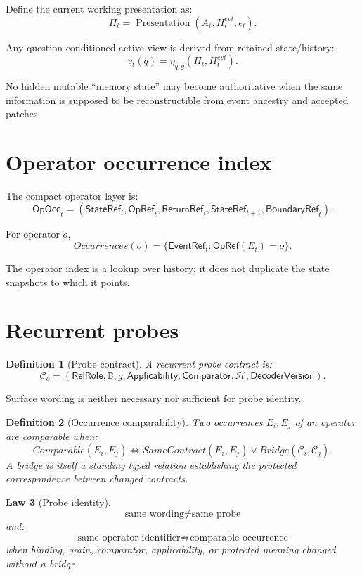 \documentclass[11pt,oneside]{article}
\newtheorem{definition}{Definition}[section]
\newtheorem{law}[definition]{Law}
\newcommand{\B}{\mathbb B}
\newcommand{\StateRef}{\mathsf{StateRef}}
\newcommand{\ReturnRef}{\mathsf{ReturnRef}}
\newcommand{\OpRef}{\mathsf{OpRef}}
\newcommand{\BoundaryRef}{\mathsf{BoundaryRef}}
\newcommand{\EventRef}{\mathsf{EventRef}}
\begin{document}
Define the current working presentation as:
\[
\boxed{
\Pi_t=\operatorname{Presentation}(A_t,H_t^{evt},\epsilon_t).
}
\]

Any question-conditioned active view is derived from retained state/history:
\[
v_t(q)=\eta_{q,g}(\Pi_t,H_t^{evt}).
\]

No hidden mutable ``memory state'' may become authoritative when the same information is supposed to be reconstructible from event ancestry and accepted patches.

\section{Operator occurrence index}

The compact operator layer is:
\[
\boxed{
\mathsf{OpOcc}_t
=
(
\StateRef_t,
\OpRef_t,
\ReturnRef_t,
\StateRef_{t+1},
\BoundaryRef_t
).
}
\]

For operator \(o\),
\[
\boxed{
Occurrences(o)
=
\{
\EventRef_t:
\OpRef(E_t)=o
\}.
}
\]

The operator index is a lookup over history; it does not duplicate the state snapshots to which it points.

\section{Recurrent probes}

\begin{definition}[Probe contract]
A recurrent probe contract is:
\[
\boxed{
\mathcal C_o=
(
\mathsf{RelRole},
\B,
g,
\mathsf{Applicability},
\mathsf{Comparator},
\mathcal H,
\mathsf{DecoderVersion}
).
}
\]
\end{definition}

Surface wording is neither necessary nor sufficient for probe identity.

\begin{definition}[Occurrence comparability]
Two occurrences \(E_i,E_j\) of an operator are comparable when:
\[
\boxed{
Comparable(E_i,E_j)
\iff
SameContract(E_i,E_j)
\lor
Bridge(\mathcal C_i,\mathcal C_j).
}
\]
A bridge is itself a standing typed relation establishing the protected correspondence between changed contracts.
\end{definition}

\begin{law}[Probe identity]
\[
\boxed{
\text{same wording}
\neq
\text{same probe}
}
\]
and:
\[
\boxed{
\text{same operator identifier}
\not\Rightarrow
\text{comparable occurrence}
}
\]
when binding, grain, comparator, applicability, or protected meaning changed without a bridge.
\end{law}
\end{document}
